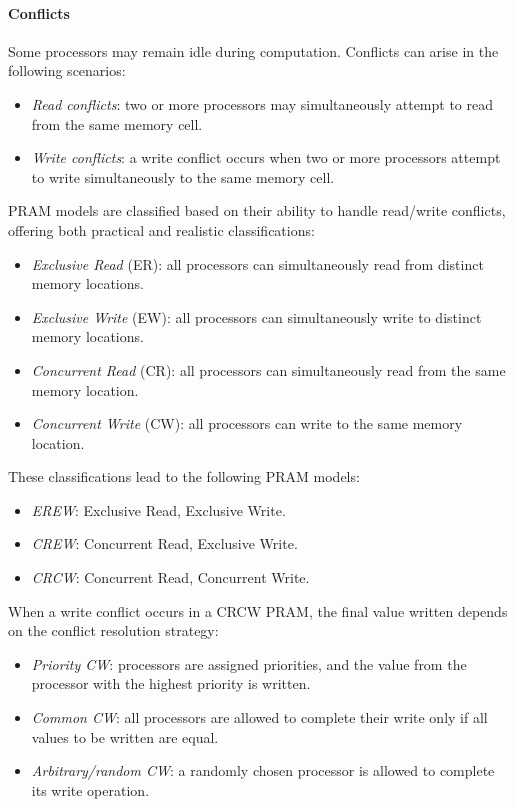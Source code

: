 \paragraph*{Conflicts}
Some processors may remain idle during computation. 
Conflicts can arise in the following scenarios:
\begin{itemize}
    \item \textit{Read conflicts}: two or more processors may simultaneously attempt to read from the same memory cell.
    \item \textit{Write conflicts}: a write conflict occurs when two or more processors attempt to write simultaneously to the same memory cell.
\end{itemize}
PRAM models are classified based on their ability to handle read/write conflicts, offering both practical and realistic classifications:
\begin{itemize}
    \item \textit{Exclusive Read} (ER): all processors can simultaneously read from distinct memory locations.
    \item \textit{Exclusive Write} (EW): all processors can simultaneously write to distinct memory locations.
    \item \textit{Concurrent Read} (CR): all processors can simultaneously read from the same memory location.
    \item \textit{Concurrent Write} (CW): all processors can write to the same memory location.
\end{itemize}
These classifications lead to the following PRAM models:
\begin{itemize}
    \item \textit{EREW}: Exclusive Read, Exclusive Write.
    \item \textit{CREW}: Concurrent Read, Exclusive Write.
    \item \textit{CRCW}: Concurrent Read, Concurrent Write.
\end{itemize}
When a write conflict occurs in a CRCW PRAM, the final value written depends on the conflict resolution strategy:
\begin{itemize}
    \item \textit{Priority CW}: processors are assigned priorities, and the value from the processor with the highest priority is written.
    \item \textit{Common CW}: all processors are allowed to complete their write only if all values to be written are equal.
    \item \textit{Arbitrary/random CW}: a randomly chosen processor is allowed to complete its write operation.
\end{itemize}

